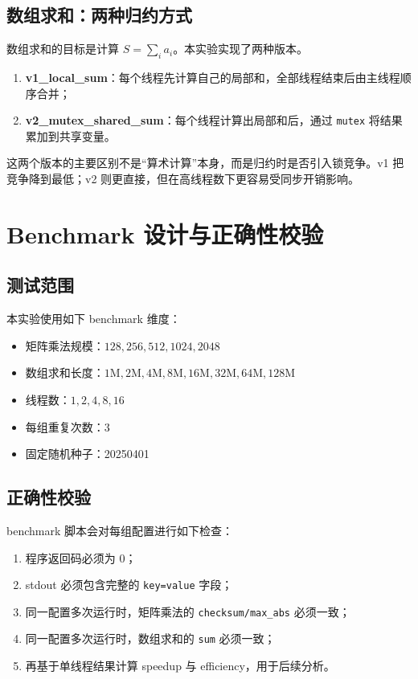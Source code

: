 \documentclass[UTF8,a4paper,12pt,fontset=none]{ctexart}
\begin{document}
\subsection{数组求和：两种归约方式}

数组求和的目标是计算 \(S=\sum_i a_i\)。本实验实现了两种版本。

\begin{enumerate}[leftmargin=2.2em]
  \item \textbf{v1\_local\_sum}：每个线程先计算自己的局部和，全部线程结束后由主线程顺序合并；
  \item \textbf{v2\_mutex\_shared\_sum}：每个线程计算出局部和后，通过 \texttt{mutex} 将结果累加到共享变量。
\end{enumerate}

这两个版本的主要区别不是“算术计算”本身，而是归约时是否引入锁竞争。v1 把竞争降到最低；v2 则更直接，但在高线程数下更容易受同步开销影响。

\section{Benchmark 设计与正确性校验}

\subsection{测试范围}

本实验使用如下 benchmark 维度：
\begin{itemize}
  \item 矩阵乘法规模：\(128,256,512,1024,2048\)
  \item 数组求和长度：\(1\text{M},2\text{M},4\text{M},8\text{M},16\text{M},32\text{M},64\text{M},128\text{M}\)
  \item 线程数：\(1,2,4,8,16\)
  \item 每组重复次数：3
  \item 固定随机种子：20250401
\end{itemize}

\subsection{正确性校验}

benchmark 脚本会对每组配置进行如下检查：
\begin{enumerate}[leftmargin=2.2em]
  \item 程序返回码必须为 0；
  \item stdout 必须包含完整的 \texttt{key=value} 字段；
  \item 同一配置多次运行时，矩阵乘法的 \texttt{checksum/max\_abs} 必须一致；
  \item 同一配置多次运行时，数组求和的 \texttt{sum} 必须一致；
  \item 再基于单线程结果计算 speedup 与 efficiency，用于后续分析。
\end{enumerate}
\end{document}
